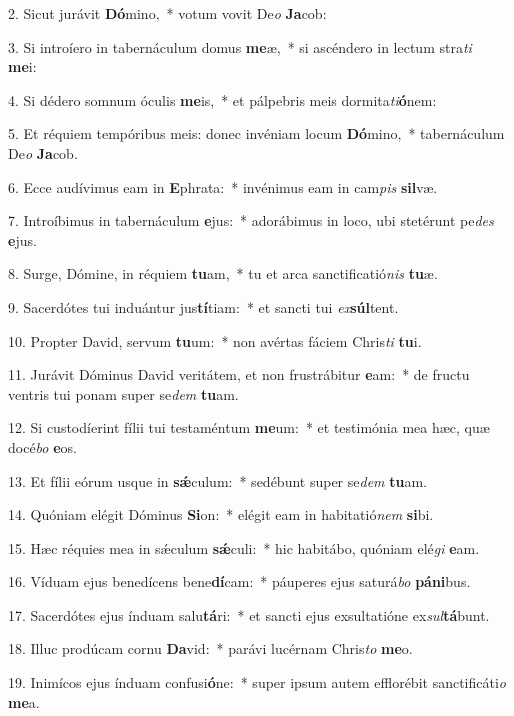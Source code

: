 2. Sicut jurávit \textbf{Dó}mino,~*  votum vovit De\textit{o} \textbf{Ja}cob:\

3. Si introíero in tabernáculum domus \textbf{me}æ,~*  si ascéndero in lectum stra\textit{ti} \textbf{me}i:\

4. Si dédero somnum óculis \textbf{me}is,~*  et pálpebris meis dormita\textit{ti}\textbf{ó}nem:\

5. Et réquiem tempóribus meis: donec invéniam locum \textbf{Dó}mino,~*  tabernáculum De\textit{o} \textbf{Ja}cob.\

6. Ecce audívimus eam in \textbf{E}phrata:~*  invénimus eam in cam\textit{pis} \textbf{sil}væ.\

7. Introíbimus in tabernáculum \textbf{e}jus:~*  adorábimus in loco, ubi stetérunt pe\textit{des} \textbf{e}jus.\

8. Surge, Dómine, in réquiem \textbf{tu}am,~*  tu et arca sanctificatió\textit{nis} \textbf{tu}æ.\

9. Sacerdótes tui induántur jus\textbf{tí}tiam:~*  et sancti tui \textit{ex}\textbf{súl}tent.\

10. Propter David, servum \textbf{tu}um:~*  non avértas fáciem Chris\textit{ti} \textbf{tu}i.\

11. Jurávit Dóminus David veritátem, et non frustrábitur \textbf{e}am:~*  de fructu ventris tui ponam super se\textit{dem} \textbf{tu}am.\

12. Si custodíerint fílii tui testaméntum \textbf{me}um:~*  et testimónia mea hæc, quæ docé\textit{bo} \textbf{e}os.\

13. Et fílii eórum usque in \textbf{sǽ}culum:~*  sedébunt super se\textit{dem} \textbf{tu}am.\

14. Quóniam elégit Dóminus \textbf{Si}on:~*  elégit eam in habitatió\textit{nem} \textbf{si}bi.\

15. Hæc réquies mea in sǽculum \textbf{sǽ}culi:~*  hic habitábo, quóniam elé\textit{gi} \textbf{e}am.\

16. Víduam ejus benedícens bene\textbf{dí}cam:~*  páuperes ejus saturá\textit{bo} \textbf{pá}\textbf{ni}bus.\

17. Sacerdótes ejus índuam salu\textbf{tá}ri:~*  et sancti ejus exsultatióne ex\textit{sul}\textbf{tá}bunt.\

18. Illuc prodúcam cornu \textbf{Da}vid:~*  parávi lucérnam Chris\textit{to} \textbf{me}o.\

19. Inimícos ejus índuam confusi\textbf{ó}ne:~*  super ipsum autem efflorébit sanctificáti\textit{o} \textbf{me}a.\

